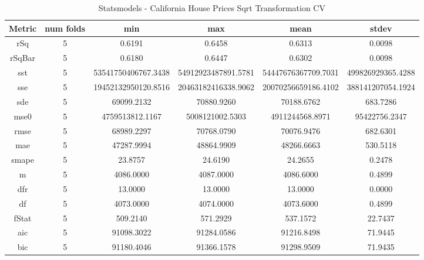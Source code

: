 \documentclass{article}
\begin{document}
\begin{table}[H]
\centering
\caption{Statsmodels - California House Prices Sqrt Transformation CV}
\label{tab:Statsmodels - House Prices Sqrt Transformation CV}
\begin{tabular}{|c|c|c|c|c|c|}\hline
Metric & num folds & min & max & mean & stdev \\ \hline \hline
rSq & 5 & 0.6191 & 0.6458 & 0.6313 & 0.0098 \\ \hline
rSqBar & 5 & 0.6180 & 0.6447 & 0.6302 & 0.0098 \\ \hline
sst & 5 & 53541750406767.3438 & 54912923487891.5781 & 54447676367709.7031 & 499826929365.4288 \\ \hline
sse & 5 & 19452132950120.8516 & 20463182416338.9062 & 20070256659186.4102 & 388141207054.1924 \\ \hline
sde & 5 & 69099.2132 & 70880.9260 & 70188.6762 & 683.7286 \\ \hline
mse0 & 5 & 4759513812.1167 & 5008121002.5303 & 4911244568.8971 & 95422756.2347 \\ \hline
rmse & 5 & 68989.2297 & 70768.0790 & 70076.9476 & 682.6301 \\ \hline
mae & 5 & 47287.9994 & 48864.9909 & 48266.6663 & 530.5118 \\ \hline
smape & 5 & 23.8757 & 24.6190 & 24.2655 & 0.2478 \\ \hline
m & 5 & 4086.0000 & 4087.0000 & 4086.6000 & 0.4899 \\ \hline
dfr & 5 & 13.0000 & 13.0000 & 13.0000 & 0.0000 \\ \hline
df & 5 & 4073.0000 & 4074.0000 & 4073.6000 & 0.4899 \\ \hline
fStat & 5 & 509.2140 & 571.2929 & 537.1572 & 22.7437 \\ \hline
aic & 5 & 91098.3022 & 91284.0586 & 91216.8498 & 71.9445 \\ \hline
bic & 5 & 91180.4046 & 91366.1578 & 91298.9509 & 71.9435 \\ \hline
\end{tabular}
\end{table}
\end{document}
